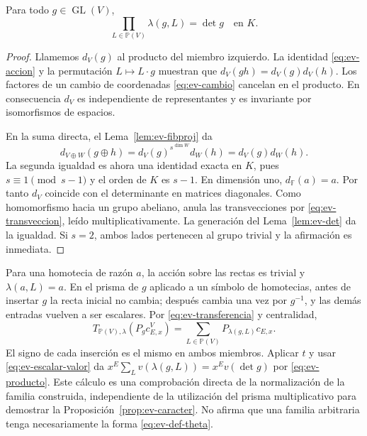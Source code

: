 \begin{proposicion}
\label{prop:ev-producto}
Para todo $g\in\operatorname{GL}(V)$,
\begin{equation}
 \prod_{L\in\mathbb P(V)}\lambda(g,L)=\det g\quad\text{en }K.
 \label{eq:ev-producto}
\end{equation}
\end{proposicion}
\begin{proof}
Llamemos $d_V(g)$ al producto del miembro izquierdo. La identidad \eqref{eq:ev-accion} y la permutación $L\mapsto L\cdot g$ muestran que $d_V(gh)=d_V(g)d_V(h)$. Los factores de un cambio de coordenadas \eqref{eq:ev-cambio} cancelan en el producto. En consecuencia $d_V$ es independiente de representantes y es invariante por isomorfismos de espacios.

En la suma directa, el Lema~\ref{lem:ev-fibproj} da
\[
 d_{V\oplus W}(g\oplus h)=d_V(g)^{s^{\dim W}}d_W(h)=d_V(g)d_W(h).
\]
La segunda igualdad es ahora una identidad exacta en $K$, pues $s\equiv1\pmod{s-1}$ y el orden de $K$ es $s-1$. En dimensión uno, $d_{\mathbb F}(a)=a$. Por tanto $d_V$ coincide con el determinante en matrices diagonales. Como homomorfismo hacia un grupo abeliano, anula las transvecciones por \eqref{eq:ev-transveccion}, leído multiplicativamente. La generación del Lema~\ref{lem:ev-det} da la igualdad. Si $s=2$, ambos lados pertenecen al grupo trivial y la afirmación es inmediata.
\end{proof}

Para una homotecia de razón $a$, la acción sobre las rectas es trivial y $\lambda(a,L)=a$. En el prisma de $g$ aplicado a un símbolo de homotecias, antes de insertar $g$ la recta inicial no cambia; después cambia una vez por $g^{-1}$, y las demás entradas vuelven a ser escalares. Por \eqref{eq:ev-transferencia} y centralidad,
\begin{equation}
 T_{\mathbb P(V),\lambda}(P_gc_{E,x}^V)
 =\sum_{L\in\mathbb P(V)}P_{\lambda(g,L)}c_{E,x}.
 \label{eq:ev-directa}
\end{equation}
El signo de cada inserción es el mismo en ambos miembros. Aplicar $t$ y usar \eqref{eq:ev-escalar-valor} da $x^E\sum_L v(\lambda(g,L))=x^E v(\det g)$ por \eqref{eq:ev-producto}. Este cálculo es una comprobación directa de la normalización de la familia construida, independiente de la utilización del prisma multiplicativo para demostrar la Proposición~\ref{prop:ev-caracter}. No afirma que una familia arbitraria tenga necesariamente la forma \eqref{eq:ev-def-theta}.


